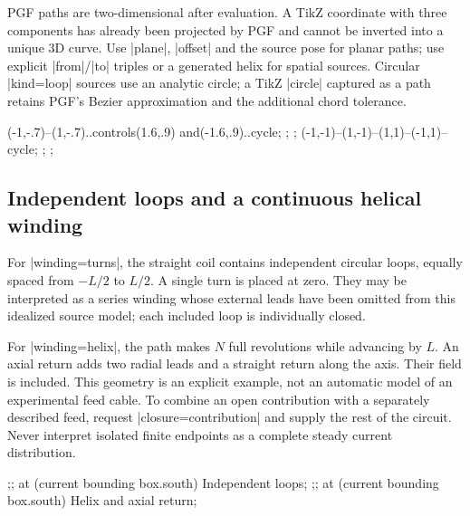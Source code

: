 PGF paths are two-dimensional after evaluation. A TikZ coordinate with three
components has already been projected by PGF and cannot be inverted into a
unique 3D curve. Use |plane|, |offset| and the source pose for planar paths;
use explicit |from|/|to| triples or a generated helix for spatial sources.
Circular |kind=loop| sources use an analytic circle; a TikZ |circle| captured
as a path retains PGF's Bezier approximation and the additional chord tolerance.
\begin{codeexample}[width=0pt]
\begingroup
\tikzpicture[femm/biot,femm/biot view={seeds={0/0/0;.4/0/0},
 step=.15,maximum length=15}]
 \path[femm/current path={current=2,curve tolerance=.001}]
  (-1,-.7)--(1,-.7)..controls(1.6,.9) and(-1.6,.9)..cycle;
 ;
 ;
\endtikzpicture
\qquad
\tikzpicture[femm/biot,femm/biot view={seeds={0/0/0;.4/0/0},
 step=.15,maximum length=15}]
 \path[femm/current path={current=2,rotate y=25}]
  (-1,-1)--(1,-1)--(1,1)--(-1,1)--cycle;
 ;
 ;
\endtikzpicture
\par
\endgroup
\end{codeexample}

\subsection{Independent loops and a continuous helical winding}
For |winding=turns|, the straight coil contains independent circular loops,
equally spaced from $-L/2$ to $L/2$. A single turn is placed at zero. They may be
interpreted as a series winding whose external leads have been omitted from this
idealized source model; each included loop is individually closed.

For |winding=helix|, the path makes $N$ full revolutions while advancing by $L$.
An axial return adds two radial leads and a straight return along the axis.
Their field is included. This geometry is an explicit example, not an automatic
model of an experimental feed cable. To combine an open contribution with a
separately described feed, request |closure=contribution| and supply the rest
of the circuit. Never interpret isolated finite endpoints as a complete steady
current distribution.
\begin{codeexample}[width=0pt]
\begingroup
{}
 \femmbiotsource[coil sources,kind=solenoid,winding=turns]
 ;;
 \node[below=3mm] at (current bounding box.south) {Independent loops};
\endtikzpicture
\qquad
{}
 \femmbiotsource[coil sources,kind=solenoid,winding=helix,closure=axis]
 ;;
 \node[below=3mm] at (current bounding box.south) {Helix and axial return};
\endtikzpicture
\par
\endgroup
\end{codeexample}

